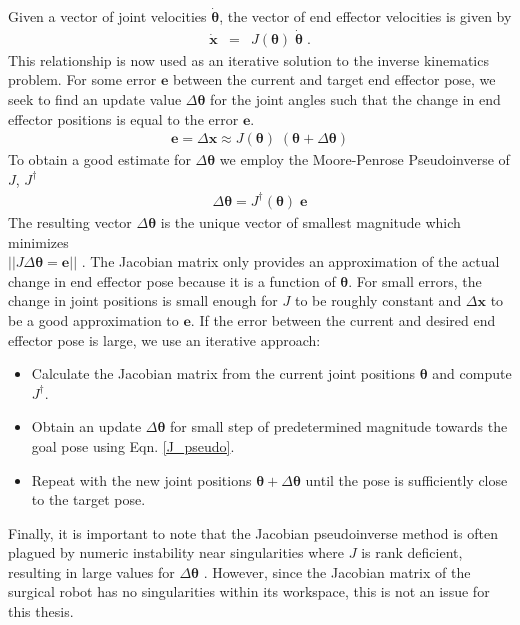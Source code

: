 Given a vector of joint velocities $\bm{\dot{\theta}}$, the vector of end effector velocities is given by
\begin{eqnarray}
	\bm{\dot{x}}&=&J(\bm{\theta}) \; \bm{\dot{\theta}} \;.
\end{eqnarray} 
This relationship is now used as an iterative solution to the inverse kinematics problem. For some error $\bm{e}$ between the current and target end effector pose, we seek to find an update value $\Delta\bm{\theta}$ for the joint angles such that the change in end effector positions is equal to the error $\bm{e}$.
\begin{eqnarray}\label{Jac_approx}
	\bm{e} = \Delta \bm{x} \approx J(\bm{\theta}) \; (\bm{\theta} + \Delta\bm{\theta})
\end{eqnarray}
To obtain a good estimate for $\Delta\bm{\theta}$ we employ the Moore-Penrose Pseudoinverse of $J$, $J^{\dagger}$
\begin{eqnarray}\label{J_pseudo}
	\Delta\bm{\theta} = J^{\dagger}(\bm{\theta}) \; \bm{e}
\end{eqnarray}
The resulting vector $\Delta\bm{\theta}$ is the unique vector of smallest magnitude which minimizes\\ 
 $||J\Delta\bm{\theta} = \bm{e}||$ \cite{iksurvey}.
The Jacobian matrix only provides an approximation of the actual change in end effector pose because it is a function of $\bm{\theta}$. For small errors, the change in joint positions is small enough for $J$ to be roughly constant and $\Delta \bm{x}$ to be a good approximation to $\bm{e}$. If the error between the current and desired end effector pose is large, we use an iterative approach:
\begin{itemize}
	\item Calculate the Jacobian matrix from the current joint positions $\bm{\theta}$ and compute $J^{\dagger}$.
	\item Obtain an update $\Delta\bm{\theta}$ for small step of predetermined magnitude towards the goal pose using Eqn. \ref{J_pseudo}.
	\item Repeat with the new joint positions $\bm{\theta} + \Delta\bm{\theta}$ until the pose is sufficiently close to the target pose.
\end{itemize}

Finally, it is important to note that the Jacobian pseudoinverse method is often plagued by numeric instability near singularities where $J$ is rank deficient, resulting in large values for $\Delta\bm{\theta}$ \cite{J_stability}. However, since the Jacobian matrix of the surgical robot has no singularities within its workspace, this is not an issue for this thesis. 

